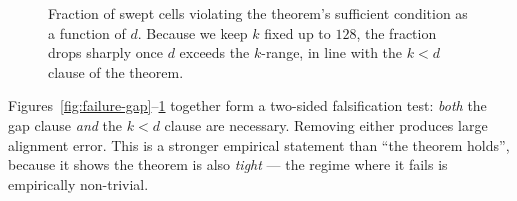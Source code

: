 \begin{figure}[H]
\centering
{}
\caption{Fraction of swept cells violating the theorem's sufficient
condition as a function of $d$. Because we keep $k$ fixed up to $128$,
the fraction drops sharply once $d$ exceeds the $k$-range, in line with
the $k < d$ clause of the theorem.}
\label{fig:failure-d}
\end{figure}

\begin{remark}
Figures~\ref{fig:failure-gap}--\ref{fig:failure-d} together form a
two-sided falsification test: \emph{both} the gap clause \emph{and} the
$k < d$ clause are necessary. Removing either produces large alignment
error. This is a stronger empirical statement than ``the theorem
holds'', because it shows the theorem is also \emph{tight} --- the
regime where it fails is empirically non-trivial.
\end{remark}
